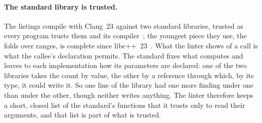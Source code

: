 \paragraph{The standard library is trusted.}
The listings compile with Clang~23 against two standard libraries, trusted as every \Cpp{} program trusts them and its compiler~\cite{thompson1984reflections}; the youngest piece they use, the folds over ranges, is complete since libc++~23~\cite{libcxx2026status}.
What the linter shows of a call is what the callee's declaration permits.
The standard fixes what  computes and leaves to each implementation how its parameters are declared: one of the two libraries takes the count by value, the other by a reference through which, by its type, it could write it.
So one line of the library had one more finding under one than under the other, though neither writes anything.
The linter therefore keeps a short, closed list of the standard's functions that it trusts only to read their arguments, and that list is part of what is trusted.

